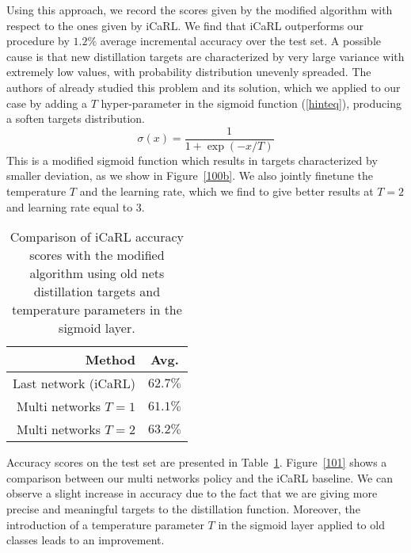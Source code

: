 \documentclass[10pt,twocolumn,letterpaper]{article}
\begin{document}
Using this approach, we record the scores given by the modified algorithm with respect to the ones given by iCaRL. We find that iCaRL outperforms our procedure by $1.2\%$ average incremental accuracy over the test set. A possible cause is that new distillation targets are characterized by very large variance with extremely low values, with probability distribution unevenly spreaded. The authors of \cite{hinton:2015} already studied this problem and its solution, which we applied to our case by adding a $T$ hyper-parameter in the sigmoid function (\ref{hinteq}), producing a soften targets distribution.
\begin{equation}
\sigma(x) = \frac{1}{1 + \exp(-x/T)} \label{hinteq}
\end{equation}
This is a modified sigmoid function which results in targets characterized by smaller deviation, as we show in Figure~\ref{100b}. We also jointly finetune the temperature $T$ and the learning rate, which we find to give better results at $T=2$ and learning rate equal to $3$.

\begin{table}
    \begin{center}
        \begin{tabular}{|r|c|}
        \hline
        Method & Avg. \\
        \hline\hline
        Last network (iCaRL) & $62.7\%$ \\
        Multi networks $T = 1$ & $61.1\%$ \\
        Multi networks $T = 2$ & $63.2\%$ \\
        \hline
        \end{tabular}
    \end{center}
\caption{Comparison of iCaRL accuracy scores with the modified algorithm using old nets distillation targets and temperature parameters in the sigmoid layer.}
\label{tab:3}
\end{table}

Accuracy scores on the test set are presented in Table~\ref{tab:3}. Figure~\ref{101} shows a comparison between our multi networks policy and the iCaRL baseline. We can observe a slight increase in accuracy due to the fact that we are giving more precise and meaningful targets to the distillation function. Moreover, the introduction of a temperature parameter $T$ in the sigmoid layer applied to old classes leads to an improvement.
\end{document}
